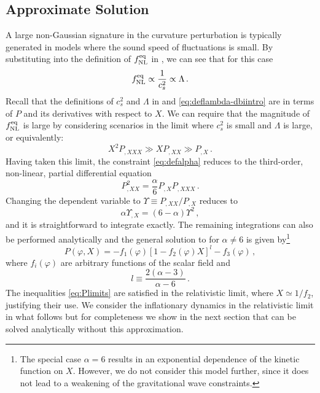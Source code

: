 \subsection{Approximate Solution}
\label{sec:approx-multi}
A large non-Gaussian signature in the curvature perturbation is 
typically generated in models where the sound speed of fluctuations 
is small.
By substituting  into the definition of $f_{\mathrm{NL}}^{\mathrm{eq}}$ in
, we can see that for this case
% 
\begin{equation}
 f_{\mathrm{NL}}^{\mathrm{eq}} \propto \frac{1}{c_s^2} \propto \Lambda\,.
\end{equation}
% 
Recall that the definitions of $c_s^2$ and $\Lambda$ in  and
\eqref{eq:deflambda-dbiintro} are in terms of $P$ and its derivatives with respect
to $X$. We can require that the magnitude of $f_{\mathrm{NL}}^{\mathrm{eq}}$ is large by considering
scenarios in the limit where $c_s^2$ is small and $\Lambda$ is large, or
equivalently:
% 
\begin{equation}
\label{eq:Plimits}
X^2 P_{,XXX} \gg XP_{,XX} \gg P_{,X} \,.
\end{equation}
% 
Having taken this limit, the constraint \eqref{eq:defalpha} reduces to the 
third-order, non-linear, partial differential equation
% 
\begin{equation}
\label{eq:pde-multi}
P^2_{,XX} = \frac{\alpha}{6} P_{,X} P_{,XXX} \,.
\end{equation}
% 
Changing the dependent variable to $\Upsilon \equiv P_{,XX}/P_{,X}$ 
reduces  to
%  
\begin{equation}
\label{eq:Qdefn-multi}
\alpha \Upsilon_{,X} = (6-\alpha )\Upsilon^2 \,,
\end{equation}
% 
and it is straightforward to integrate  
exactly. The remaining integrations can also be performed analytically 
and the general solution to  for $\alpha \ne
6$ is given by\footnote{The special case $\alpha =6$ results in an 
exponential dependence of the kinetic function on $X$. However, we 
do not consider this model further, since it does not lead to a 
weakening of the gravitational wave constraints.}
% 
\begin{equation}
\label{eq:gensoln-multi}
P (\varphi , X) = -f_1 (\varphi ) \left[ 1-f_2 (\varphi ) X 
\right]^l -f_3(\varphi ) \,,
\end{equation}
% 
where $f_i (\varphi )$ are arbitrary functions of the scalar 
field and
%  
\begin{equation}
l \equiv \frac{2(\alpha -3 )}{\alpha -6} \, . 
\end{equation}
% 
The inequalities \eqref{eq:Plimits} 
are satisfied in the relativistic limit, where $X \simeq 1/f_2$, justifying their use.
We consider the inflationary dynamics in the relativistic limit in what follows but for
completeness we show in the next section that  can be solved
analytically without this approximation. 

